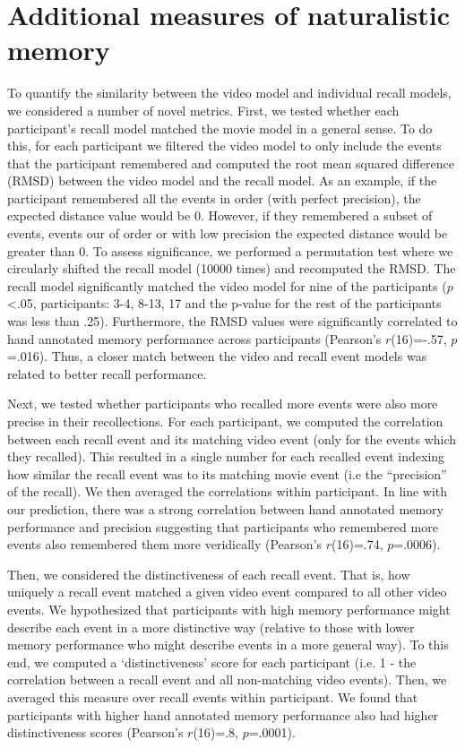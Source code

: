 \documentclass{article}
\begin{document}
{\section{Additional measures of naturalistic memory}
To quantify the similarity between the video model and individual recall models, we considered a number of novel metrics.  First, we tested whether each participant's recall model matched the movie model in a general sense. To do this, for each participant we filtered the video model to only include the events that the participant remembered and computed the root mean squared difference (RMSD) between the video model and the recall model. As an example, if the participant remembered all the events in order (with perfect precision), the expected distance value would be 0. However, if they remembered a subset of events, events our of order or with low precision the expected distance would be greater than 0. To assess significance, we performed a permutation test where we circularly shifted the recall model (10000 times) and recomputed the RMSD. The recall model significantly matched the video model for nine of the participants ($p$<.05, participants: 3-4, 8-13, 17 and the p-value for the rest of the participants was less than .25). Furthermore, the RMSD values were significantly correlated to hand annotated memory performance across participants (Pearson's $r$(16)=-.57, $p$=.016). Thus, a closer match between the video and recall event models was related to better recall performance.

Next, we tested whether participants who recalled more events were also more precise in their recollections. For each participant, we computed the correlation between each recall event and its matching video event (only for the events which they recalled). This resulted in a single number for each recalled event indexing how similar the recall event was to its matching movie event (i.e the ``precision'' of the recall). We then averaged the correlations within participant. In line with our prediction, there was a strong correlation between hand annotated memory performance and precision suggesting that participants who remembered more events also remembered them more veridically (Pearson's $r$(16)=.74, $p$=.0006).

Then, we considered the distinctiveness of each recall event. That is, how uniquely a recall event matched a given video event compared to all other video events. We hypothesized that participants with high memory performance might describe each event in a more distinctive way (relative to those with lower memory performance who might describe events in a more general way). To this end, we computed a `distinctiveness' score for each participant (i.e. 1 - the correlation between a recall event and all non-matching video events).  Then, we averaged this measure over recall events within participant.  We found that participants with higher hand annotated memory performance also had higher distinctiveness scores (Pearson's $r$(16)=.8, $p$=.0001).

}
\end{document}
